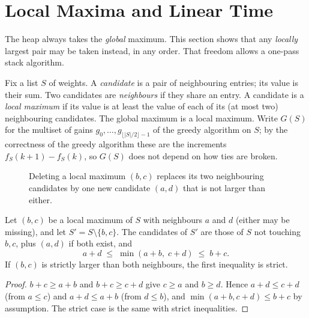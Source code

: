 \documentclass[11pt]{article}
\begin{document}
\section{Local Maxima and Linear Time}\label{sec:linear}
The heap always takes the \emph{global} maximum. This section shows that
any \emph{locally} largest pair may be taken instead, in any order. That
freedom allows a one-pass stack algorithm.

Fix a list $S$ of weights. A \emph{candidate} is a pair of neighbouring
entries; its value is their sum. Two candidates are \emph{neighbours} if
they share an entry. A candidate is a \emph{local maximum} if its value is
at least the value of each of its (at most two) neighbouring candidates.
The global maximum is a local maximum. Write $G(S)$ for the multiset of
gains $g_0,\dots,g_{\lfloor|S|/2\rfloor-1}$ of the greedy algorithm on $S$;
by the correctness of the greedy algorithm these are the increments $f_S(k+1)-f_S(k)$, so
$G(S)$ does not depend on how ties are broken.

\begin{figure}[H]
\centering
{}
\caption{Deleting a local maximum $(b,c)$ replaces its two neighbouring
candidates by one new candidate $(a,d)$ that is not larger than either.}\label{fig:peel}
\end{figure}

\begin{theorembox}
Let $(b,c)$ be a local maximum of $S$ with neighbours $a$ and $d$ (either may
be missing), and let $S'=S\setminus\{b,c\}$. The candidates of $S'$ are those
of $S$ not touching $b,c$, plus $(a,d)$ if both exist, and
\[ a+d\;\le\;\min(a+b,\;c+d)\;\le\;b+c . \]
If $(b,c)$ is strictly larger than both neighbours, the first inequality is strict.
\end{theorembox}
\begin{proof}
$b+c\ge a+b$ and $b+c\ge c+d$ give $c\ge a$ and $b\ge d$. Hence
$a+d\le c+d$ (from $a\le c$) and $a+d\le a+b$ (from $d\le b$), and
$\min(a+b,c+d)\le b+c$ by assumption. The strict case is the
same with strict inequalities.
\end{proof}
\end{document}
